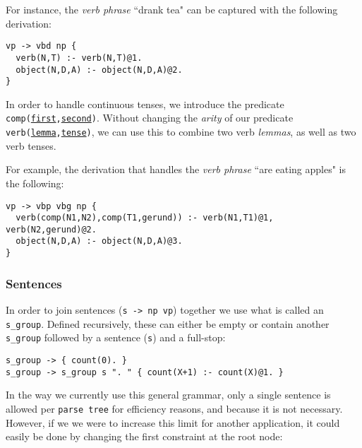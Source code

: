For instance, the \textit{verb phrase} ``drank tea" can be captured with the following derivation:

\begin{displayquote}
\begin{lstlisting}
vp -> vbd np {
  verb(N,T) :- verb(N,T)@1.
  object(N,D,A) :- object(N,D,A)@2.
}
\end{lstlisting}
\end{displayquote}

In order to handle continuous tenses, we introduce the predicate \texttt{comp(\underline{first},\underline{second})}. Without changing the \textit{arity} of our predicate \texttt{verb(\underline{lemma},\underline{tense})}, we can use this to combine two verb \textit{lemmas}, as well as two verb tenses.

For example, the derivation that handles the \textit{verb phrase} ``are eating apples" is the following:

\begin{displayquote}
\begin{lstlisting}
vp -> vbp vbg np {
  verb(comp(N1,N2),comp(T1,gerund)) :- verb(N1,T1)@1, verb(N2,gerund)@2.
  object(N,D,A) :- object(N,D,A)@3.
}
\end{lstlisting}
\end{displayquote}

\subsubsection{Sentences}

In order to join sentences (\texttt{s -> np vp}) together we use what is called an \texttt{s\_group}. Defined recursively, these can either be empty or contain another \texttt{s\_group} followed by a sentence (\texttt{s}) and a full-stop:

\begin{displayquote}
\begin{lstlisting}
s_group -> { count(0). }
s_group -> s_group s ". " { count(X+1) :- count(X)@1. }
\end{lstlisting}
\end{displayquote}

In the way we currently use this general grammar, only a single sentence is allowed per \texttt{parse tree} for efficiency reasons, and because it is not necessary. However, if we we were to increase this limit for another application, it could easily be done by changing the first constraint at the root node:

